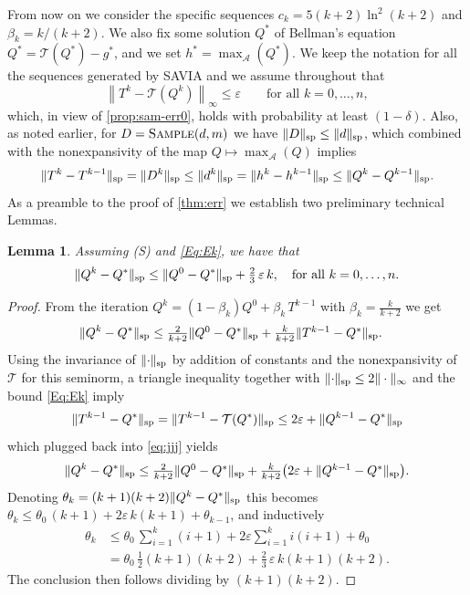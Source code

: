 \documentclass{article}
\newcommand{\cA}{\mathcal{A}}
\newcommand{\T}{\mathcal{T}}
\newcommand*{\infn}[1]{\left\|{#1}\right\|_{\infty}}
\renewcommand{\sp}[1]{\|{#1}\|_\text{\rm sp}}
\newcommand{\maxA}{\mbox{$\max_\cA$}}
\theoremstyle{plain}
\newtheorem{lemma}[theorem]{Lemma}
\theoremstyle{definition}
\theoremstyle{remark}
\begin{document}
From now on we 
consider the specific sequences $c_k=5(k+2)\ln^2(k+2)$ and $\beta_k=k/(k+2)$.
We also fix some
solution  $Q^*$  of Bellman's equation $Q^*=\T(Q^*)-g^*$, and we set $h^*=\maxA(Q^*)$.
We keep the notation for all the sequences generated by
{\rm SAVIA} and we assume throughout that
\begin{equation}\label{Eq:Ek}
\infn{T^k-\T(Q^{k})}\le \varepsilon\qquad \text{for all} \,\, k=0,\ldots,n,
\end{equation}
which, in view of \cref{prop:sam-err0}, holds with probability at least $(1-\delta)$.
Also, as noted earlier, for $D=\mbox{\sc Sample}(d,m)$ we have $\sp{D}\leq\sp{d}$, which combined with 
 the nonexpansivity of the map $Q\mapsto \maxA(Q)$ implies
\begin{equation}\label{Eq:spk}\sp{T^k-T^{k-1}}=\sp{D^k} \le \sp{d^k}=\sp{h^k-h^{k-1}}\le \sp{Q^{k}-Q^{k-1}}.
\end{equation}
As a preamble to the proof of \cref{thm:err}
we establish two preliminary technical Lemmas. 
\begin{lemma}\label{Le:uno}Assuming \mbox{\sc (S)} and \eqref{Eq:Ek}, we have that $$\sp{Q^k-Q^*}\leq \sp{Q^0-Q^*}+\mbox{$\frac{2}{3}$}\,\varepsilon\,k, \quad \text{for all} \,\, k=0,\ldots,n.$$ 
\end{lemma}
\begin{proof} From the iteration $Q^{k}=(1-\beta_k)Q^0+\beta_k\,T^{k-1}$ with $\beta_k=\frac{k}{k+2}$ we get
\begin{align}\label{eq:jjj}
    \sp{Q^{k}-Q^*}&\le \mbox{$\frac{2}{k+2}\sp{Q^0-Q^*}+\frac{k}{k+2}\sp{T^{k-1}-Q^*}$}.
\end{align}
Using the invariance of $\sp{\cdot}$ by addition of constants and the nonexpansivity of $\T$ for this seminorm, a triangle inequality together with $\sp{\cdot}\leq 2\|\cdot\|_\infty$ and the bound \eqref{Eq:Ek} imply
\begin{equation}\label{Eq:cit}
    \sp{T^{k-1}-Q^*}=\sp{T^{k-1}-\T(Q^*)}\le 2\varepsilon+\sp{Q^{k-1}-Q^*}
\end{equation}
which plugged back into \eqref{eq:jjj} yields
$$
\sp{Q^{k}-Q^*}\le \mbox{$\frac{2}{k+2}\sp{Q^0-Q^*}+\frac{k}{k+2}\big(2\varepsilon+\sp{Q^{k-1}-Q^*}\big)$}.$$
Denoting $\theta_k=(k+1)(k+2)\sp{Q^{k}-Q^*}$ this becomes
$\theta_k\leq \theta_0\, (k+1)+2\varepsilon\,k(k+1)+\theta_{k-1}$,
and inductively
\begin{align*}
    \theta_k&\leq \mbox{$\theta_0\, \sum_{i=1}^k (i+1)+2\varepsilon\sum_{i=1}^ki(i+1)+\theta_0$}\\
    &=\mbox{$\theta_0\,\frac{1}{2}(k+1)(k+2)+ \frac{2}{3}\,\varepsilon\,k(k+1)(k+2)$.}
\end{align*}
The conclusion then follows dividing by $(k+1)(k+2)$.
\end{proof}
\end{document}

